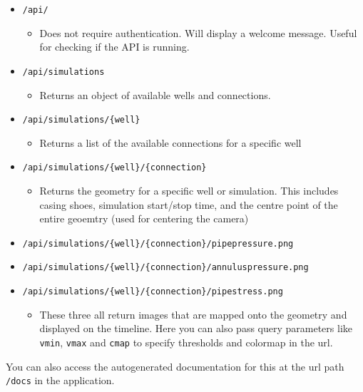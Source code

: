 \begin{itemize}
\item
  \texttt{/api/}

  \begin{itemize}
  \tightlist
  \item
    Does not require authentication. Will display a welcome message.
    Useful for checking if the API is running.
  \end{itemize}
\item
  \texttt{/api/simulations}

  \begin{itemize}
  \tightlist
  \item
    Returns an object of available wells and connections.
  \end{itemize}
\item
  \texttt{/api/simulations/\{well\}}

  \begin{itemize}
  \tightlist
  \item
    Returns a list of the available connections for a specific well
  \end{itemize}
\item
  \texttt{/api/simulations/\{well\}/\{connection\}}

  \begin{itemize}
  \tightlist
  \item
    Returns the geometry for a specific well or simulation. This
    includes casing shoes, simulation start/stop time, and the centre
    point of the entire geoemtry (used for centering the camera)
  \end{itemize}
\item
  \texttt{/api/simulations/\{well\}/\{connection\}/pipepressure.png}
\item
  \texttt{/api/simulations/\{well\}/\{connection\}/annuluspressure.png}
\item
  \texttt{/api/simulations/\{well\}/\{connection\}/pipestress.png}

  \begin{itemize}
  \tightlist
  \item
    These three all return images that are mapped onto the geometry and
    displayed on the timeline. Here you can also pass query parameters
    like \texttt{vmin}, \texttt{vmax} and \texttt{cmap} to specify
    thresholds and colormap in the url.
  \end{itemize}
\end{itemize}

You can also access the autogenerated documentation for this at the url
path \texttt{/docs} in the application.

